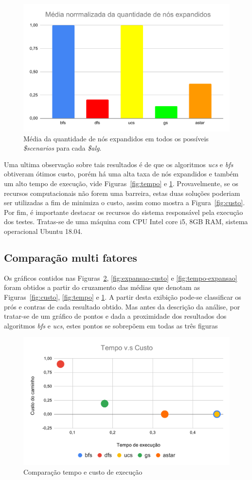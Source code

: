\documentclass[12pt]{article}
\begin{document}
\begin{figure}[hbt!]
  \centering
  \includegraphics[width=.8\textwidth]{fig/expansao.pdf}
  \caption{Média da quantidade de nós expandidos em todos os possíveis \textit{\$scenarios} para cada \textit{\$alg}.}
  \label{fig:expansao}
\end{figure}

Uma ultima observação sobre tais resultados é de que os algoritmos \textit{ucs}
e \textit{bfs} obtiveram ótimos custo, porém há uma alta taxa de nós expandidos
e também um alto tempo de execução, vide Figuras~\ref{fig:tempo} e
\ref{fig:expansao}.
Provavelmente, se os recursos computacionais não forem uma barreira, estas
duas soluções poderiam ser utilizadas a fim de minimiza o custo, assim
como mostra a Figura~\ref{fig:custo}.
Por fim, é importante destacar os recursos do sistema responsável
pela execução dos testes.
Tratas-se de uma máquina com CPU Intel core i5, 8GB RAM, sistema operacional
Ubuntu 18.04.

\subsection{Comparação multi fatores}

Os gráficos contidos nas Figuras~\ref{fig:tempo-custo},
\ref{fig:expansao-custo} e \ref{fig:tempo-expansao} foram obtidos a partir
do cruzamento das médias que denotam as Figuras~\ref{fig:custo},
\ref{fig:tempo} e \ref{fig:expansao}.
A partir desta exibição pode-se classificar os prós e contras de cada resultado
obtido.
Mas antes da descrição da análise, por tratar-se de um gráfico de pontos
e dada a proximidade dos resultados dos algoritmos \textit{bfs} e \textit{ucs},
estes pontos se sobrepõem em todas as três figuras
\begin{figure}[hbt!]
  \centering
  \includegraphics[width=.8\textwidth]{fig/tempo-custo.pdf}
  \caption{Comparação tempo e custo de execução}
  \label{fig:tempo-custo}
\end{figure}
\end{document}
